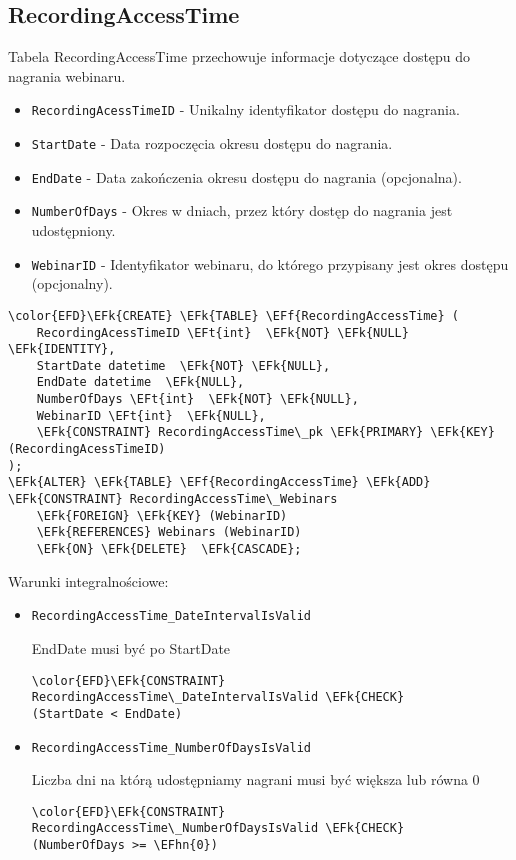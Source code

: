 \documentclass[11pt]{article}
\newcommand{\EFk}[1]{\textcolor{EFk}{\textbf{#1}}} %
\newcommand{\EFf}[1]{\textcolor{EFf}{#1}} %
\newcommand{\EFt}[1]{\textcolor{EFt}{\textbf{#1}}} %
\newcommand{\EFhn}[1]{\textcolor{EFhn}{#1}} %
\begin{document}
\subsection{RecordingAccessTime}
\label{sec:orge1b9463}
Tabela RecordingAccessTime przechowuje informacje dotyczące dostępu do nagrania webinaru.
\begin{itemize}
\item \texttt{RecordingAcessTimeID} - Unikalny identyfikator dostępu do nagrania.
\item \texttt{StartDate} - Data rozpoczęcia okresu dostępu do nagrania.
\item \texttt{EndDate} - Data zakończenia okresu dostępu do nagrania (opcjonalna).
\item \texttt{NumberOfDays} - Okres w dniach, przez który dostęp do nagrania jest udostępniony.
\item \texttt{WebinarID} - Identyfikator webinaru, do którego przypisany jest okres dostępu (opcjonalny).
\end{itemize}
\begin{Code}
\begin{Verbatim}
\color{EFD}\EFk{CREATE} \EFk{TABLE} \EFf{RecordingAccessTime} (
    RecordingAcessTimeID \EFt{int}  \EFk{NOT} \EFk{NULL} \EFk{IDENTITY},
    StartDate datetime  \EFk{NOT} \EFk{NULL},
    EndDate datetime  \EFk{NULL},
    NumberOfDays \EFt{int}  \EFk{NOT} \EFk{NULL},
    WebinarID \EFt{int}  \EFk{NULL},
    \EFk{CONSTRAINT} RecordingAccessTime\_pk \EFk{PRIMARY} \EFk{KEY}  (RecordingAcessTimeID)
);
\EFk{ALTER} \EFk{TABLE} \EFf{RecordingAccessTime} \EFk{ADD} \EFk{CONSTRAINT} RecordingAccessTime\_Webinars
    \EFk{FOREIGN} \EFk{KEY} (WebinarID)
    \EFk{REFERENCES} Webinars (WebinarID)
    \EFk{ON} \EFk{DELETE}  \EFk{CASCADE};
\end{Verbatim}
\end{Code}
Warunki integralnościowe:


\begin{itemize}
\item \texttt{RecordingAccessTime\_DateIntervalIsValid}

EndDate musi być po StartDate
\begin{Code}
\begin{Verbatim}
\color{EFD}\EFk{CONSTRAINT} RecordingAccessTime\_DateIntervalIsValid \EFk{CHECK}
(StartDate < EndDate)
\end{Verbatim}
\end{Code}
\item \texttt{RecordingAccessTime\_NumberOfDaysIsValid}

Liczba dni na którą udostępniamy nagrani musi być większa lub równa 0
\begin{Code}
\begin{Verbatim}
\color{EFD}\EFk{CONSTRAINT} RecordingAccessTime\_NumberOfDaysIsValid \EFk{CHECK}
(NumberOfDays >= \EFhn{0})
\end{Verbatim}
\end{Code}
\end{itemize}
\end{document}
